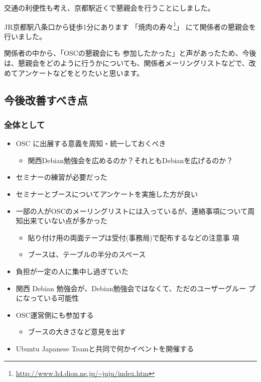 \documentclass[mingoth,a4paper]{jsarticle}
\begin{document}
交通の利便性も考え、京都駅近くで懇親会を行うことにしました。

JR京都駅八条口から徒歩1分にあります
「焼肉の寿々\footnote{\url{http://www.h4.dion.ne.jp/~juju/index.htm}}」
にて関係者の懇親会を行いました。

関係者の中から、「OSCの懇親会にも
参加したかった」と声があったため、今後は、懇親会をどのように行うかについても、関係者メーリングリストなどで、改めてアンケートなどをとりたいと思います。

\subsection{今後改善すべき点}

\subsubsection{全体として}

\begin{itemize}
 \item OSC に出展する意義を周知・統一しておくべき
       \begin{itemize}
	\item 関西Debian勉強会を広めるのか？それともDebianを広げるのか？
       \end{itemize}
 \item セミナーの練習が必要だった
 \item セミナーとブースについてアンケートを実施した方が良い
 \item 一部の人がOSCのメーリングリストには入っているが、連絡事項について周知出来ていない点が多かった
       \begin{itemize}
	\item 貼り付け用の両面テープは受付(事務局)で配布するなどの注意事
	      項
	\item ブースは、テーブルの半分のスペース
       \end{itemize}
 \item 負担が一定の人に集中し過ぎていた
 \item 関西 Debian 勉強会が、Debian勉強会ではなくて、ただのユーザーグルー
       プになっている可能性
 \item OSC運営側にも参加する
       \begin{itemize}
	\item ブースの大きさなど意見を出す
       \end{itemize}
 \item Ubuntu Japanese Teamと共同で何かイベントを開催する
\end{itemize}
\end{document}
